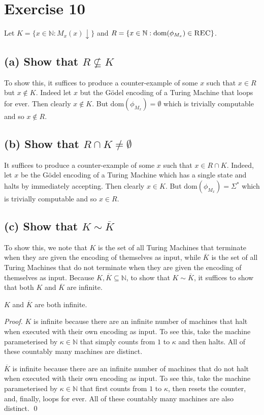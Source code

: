 \documentclass[11pt]{llncs}
\begin{document}
\section*{Exercise 10}

Let $K = \{x \in \mathbb{N}: M_x(x)\downarrow\}$ and
$R = \{x \in \mathbb{N}: \text{dom}(\phi_{M_x}) \in \textsc{REC}\}$.

\subsection*{(a) Show that $R \not\subseteq K$}

To show this, it suffices to produce a counter-example of some $x$ such that $x
\in R$ but $x \not\in K$. Indeed let $x$ but the G\"odel encoding of a Turing
Machine that loops for ever. Then clearly $x \not\in K$. But
$\text{dom}(\phi_{M_x}) = \emptyset$ which is trivially computable and so $x
\not\in R$.

\subsection*{(b) Show that $R \cap K \neq \emptyset$}

It suffices to produce a counter-example of some $x$ such that $x \in R \cap K$.
Indeed, let $x$ be the G\"odel encoding of a Turing Machine which has a single
state and halts by immediately accepting. Then clearly $x \in K$. But
$\text{dom}(\phi_{M_x}) = \Sigma^*$ which is trivially computable and so $x \in
R$.

\subsection*{(c) Show that $K \sim \overline K$}

To show this, we note that $K$ is the set of all Turing Machines that terminate
when they are given the encoding of themselves as input, while $\overline K$ is
the set of all Turing Machines that do not terminate when they are given the
encoding of themselves as input. Because $K, \overline K \subseteq \mathbb{N}$,
to show that $K \sim \overline K$, it suffices to show that both $K$ and
$\overline K$ are infinite.

\begin{lemma}
$K$ and $\overline K$ are both infinite.
\end{lemma}
\begin{proof}
$K$ is infinite because there are an infinite number of machines that halt when
executed with their own encoding as input. To see this, take the machine
parameterised by $\kappa \in \mathbb{N}$ that simply counts from $1$ to $\kappa$
and then halts. All of these countably many machines are distinct.

$\overline K$ is infinite because there are an infinite number of machines that
do not halt when executed with their own encoding as input. To see this, take
the machine parameterised by $\kappa \in \mathbb{N}$ that first counts from $1$
to $\kappa$, then resets the counter, and, finally, loops for ever. All of these
countably many machines are also distinct.
\qed
\end{proof}
\end{document}
